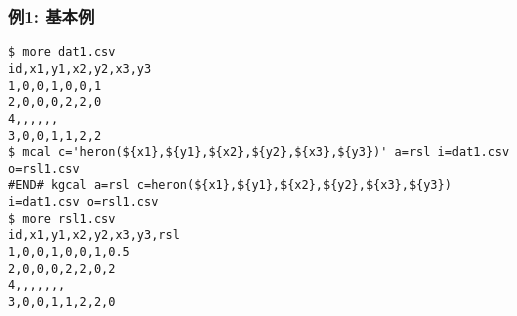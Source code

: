 \subsubsection*{例1: 基本例}



\begin{Verbatim}[baselinestretch=0.7,frame=single]
$ more dat1.csv
id,x1,y1,x2,y2,x3,y3
1,0,0,1,0,0,1
2,0,0,0,2,2,0
4,,,,,,
3,0,0,1,1,2,2
$ mcal c='heron(${x1},${y1},${x2},${y2},${x3},${y3})' a=rsl i=dat1.csv o=rsl1.csv
#END# kgcal a=rsl c=heron(${x1},${y1},${x2},${y2},${x3},${y3}) i=dat1.csv o=rsl1.csv
$ more rsl1.csv
id,x1,y1,x2,y2,x3,y3,rsl
1,0,0,1,0,0,1,0.5
2,0,0,0,2,2,0,2
4,,,,,,,
3,0,0,1,1,2,2,0
\end{Verbatim}
